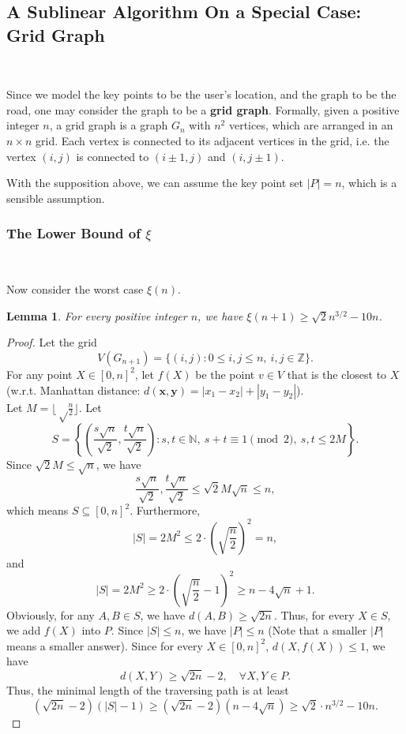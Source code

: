 \documentclass[11pt]{article}
\theoremstyle{plain}
\newtheorem{lemma}{Lemma}[section]
\begin{document}
\subsection{A Sublinear Algorithm On a Special Case: Grid Graph}\

Since we model the key points to be the user's location, and the graph to be the road, one may consider the graph to be a \textbf{grid graph}. Formally, given a positive integer $n$, a grid graph is a graph $G_n$ with $n^2$ vertices, which are arranged in an $n\times n$ grid. Each vertex is connected to its adjacent vertices in the grid, i.e. the vertex $(i,j)$ is connected to $(i\pm 1,j)$ and $(i,j\pm 1)$.

With the supposition above, we can assume the key point set $|P|=n$, which is a sensible assumption.

\subsubsection{The Lower Bound of \texorpdfstring{$\xi$}{ }}\

Now consider the worst case $\xi(n)$. 

\begin{lemma}
\label{hahaha1}
For every positive integer $n$, we have $\xi(n+1)\ge \sqrt{2}n^{3/2}-10n$.
\end{lemma}
\begin{proof}
Let the grid
$$V(G_{n+1})=\{(i,j):0\le i,j\le n,\ i,j\in \mathbb{Z}\}.$$
For any point $X\in [0,n]^2$, let $f(X)$ be the point $v\in V$ that is the closest to $X$ (w.r.t. Manhattan distance: $d(\mathbf{x},\mathbf{y})=|x_1-x_2|+|y_1-y_2|$).\\
Let $M=\lfloor \sqrt\frac{n}{2}\rfloor$. Let
$$S=\left\{\left(\dfrac{s\sqrt{n}}{\sqrt{2}},\dfrac{t\sqrt{n}}{\sqrt{2}}\right):s,t\in \mathbb{N},\ s+t\equiv 1\pmod 2,\ s,t\le 2M\right\}.$$
Since $\sqrt{2}M\le \sqrt{n}$, we have
$$\dfrac{s\sqrt{n}}{\sqrt{2}},\dfrac{t\sqrt{n}}{\sqrt{2}}\le \sqrt{2}M\sqrt{n}\le n,$$
which means $S\subseteq [0,n]^2$. Furthermore,
$$|S|=2M^2\le 2\cdot \left(\sqrt{\dfrac{n}{2}}\right)^2=n,$$
and
$$|S|=2M^2\ge 2\cdot \left(\sqrt{\dfrac{n}{2}}-1\right)^2\ge n-4\sqrt{n}+1.$$
Obviously, for any $A,B\in S$, we have $d(A,B)\ge \sqrt{2n}$. Thus, for every $X\in S$, we add $f(X)$ into $P$. Since $|S|\le n$, we have $|P|\le n$ (Note that a smaller $|P|$ means a smaller answer). Since for every $X\in [0,n]^2$, $d(X,f(X))\le 1$, we have
$$d(X,Y)\ge \sqrt{2n}-2,\quad \forall X,Y\in P.$$
Thus, the minimal length of the traversing path is at least
$$(\sqrt{2n}-2)(|S|-1)\ge (\sqrt{2n}-2)(n-4\sqrt{n})\ge \sqrt{2}\cdot n^{3/2}-10n.$$
\end{proof}
\end{document}
